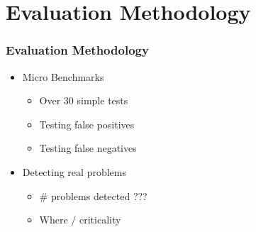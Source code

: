 \section{Evaluation Methodology}
\frametitle{Evaluation Methodology}

\begin{frame}

\begin{itemize}
	\item Micro Benchmarks
	\begin{itemize}
		\item Over 30 simple tests
		\item Testing false positives
		\item Testing false negatives
	\end{itemize}
	\item Detecting real problems
	\begin{itemize}
		\item \# problems detected ???
		\item Where / criticality
	\end{itemize}
\end{itemize}

\end{frame}
